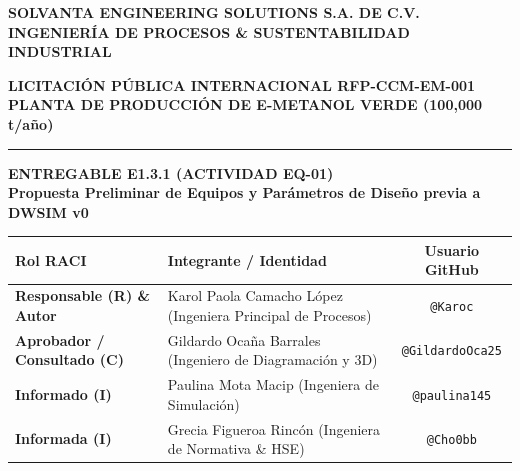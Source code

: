 \documentclass[11pt,letterpaper]{article}
\begin{document}
\begin{titlepage}
    \centering
    \vspace*{0.5cm}
    {\huge \textbf{\color{SolvantaNavy}SOLVANTA ENGINEERING SOLUTIONS S.A. DE C.V.}}\\[0.4cm]
    {\large \textbf{\color{SolvantaTeal}INGENIERÍA DE PROCESOS \& SUSTENTABILIDAD INDUSTRIAL}}\\[1.5cm]

    \begin{tcolorbox}[colback=SolvantaLightGray,colframe=SolvantaNavy,arc=3mm,boxrule=1.2pt]
        \centering \vspace{0.2cm}
        {\Large \textbf{\color{SolvantaNavy}LICITACIÓN PÚBLICA INTERNACIONAL RFP-CCM-EM-001}}\\[0.2cm]
        {\large \textbf{\color{SolvantaTeal}PLANTA DE PRODUCCIÓN DE E-METANOL VERDE (100,000 t/año)}}\\[0.3cm]
        \rule{\linewidth}{0.5pt}
        \vspace{0.2cm}
        {\LARGE \textbf{\color{SolvantaNavy}ENTREGABLE E1.3.1 (ACTIVIDAD EQ-01)}}\\[0.2cm]
        {\Large \textbf{\color{SolvantaTeal}Propuesta Preliminar de Equipos y Parámetros de Diseño previa a DWSIM v0}}\\[0.2cm]
    \end{tcolorbox}

    \vspace{1.5cm}

    \begin{table}[h!]
        \centering
        \small
        \begin{tabularx}{0.95\textwidth}{|l|X|c|}
            \hline
            \rowcolor{SolvantaNavy}
            \textbf{\color{white}Rol RACI} & \textbf{\color{white}Integrante / Identidad} & \textbf{\color{white}Usuario GitHub} \\
            \hline
            \textbf{Responsable (R) \& Autor} & Karol Paola Camacho López (Ingeniera Principal de Procesos) & \texttt{@Karoc} \\
            \hline
            \textbf{Aprobador / Consultado (C)} & Gildardo Ocaña Barrales (Ingeniero de Diagramación y 3D) & \texttt{@GildardoOca25} \\
            \hline
            \textbf{Informado (I)} & Paulina Mota Macip (Ingeniera de Simulación) & \texttt{@paulina145} \\
            \hline
            \textbf{Informada (I)} & Grecia Figueroa Rincón (Ingeniera de Normativa \& HSE) & \texttt{@Cho0bb} \\
            \hline
        \end{tabularx}
    \end{table}


\end{titlepage}
\end{document}
